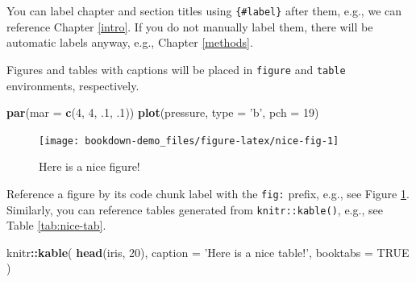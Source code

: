 \documentclass[
]{book}
\newenvironment{Shaded}{\begin{snugshade}}{\end{snugshade}}
\newcommand{\DataTypeTok}[1]{\textcolor[rgb]{0.13,0.29,0.53}{#1}}
\newcommand{\DecValTok}[1]{\textcolor[rgb]{0.00,0.00,0.81}{#1}}
\newcommand{\FloatTok}[1]{\textcolor[rgb]{0.00,0.00,0.81}{#1}}
\newcommand{\KeywordTok}[1]{\textcolor[rgb]{0.13,0.29,0.53}{\textbf{#1}}}
\newcommand{\NormalTok}[1]{#1}
\newcommand{\OperatorTok}[1]{\textcolor[rgb]{0.81,0.36,0.00}{\textbf{#1}}}
\newcommand{\OtherTok}[1]{\textcolor[rgb]{0.56,0.35,0.01}{#1}}
\newcommand{\StringTok}[1]{\textcolor[rgb]{0.31,0.60,0.02}{#1}}
\begin{document}
You can label chapter and section titles using \texttt{\{\#label\}} after them, e.g., we can reference Chapter \ref{intro}. If you do not manually label them, there will be automatic labels anyway, e.g., Chapter \ref{methods}.

Figures and tables with captions will be placed in \texttt{figure} and \texttt{table} environments, respectively.

\begin{Shaded}
\begin{Highlighting}[]
\KeywordTok{par}\NormalTok{(}\DataTypeTok{mar =} \KeywordTok{c}\NormalTok{(}\DecValTok{4}\NormalTok{, }\DecValTok{4}\NormalTok{, }\FloatTok{.1}\NormalTok{, }\FloatTok{.1}\NormalTok{))}
\KeywordTok{plot}\NormalTok{(pressure, }\DataTypeTok{type =} \StringTok{'b'}\NormalTok{, }\DataTypeTok{pch =} \DecValTok{19}\NormalTok{)}
\end{Highlighting}
\end{Shaded}

\begin{figure}

{\centering \texttt{[image: bookdown-demo\_files/figure-latex/nice-fig-1]} 

}

\caption{Here is a nice figure!}\label{fig:nice-fig}
\end{figure}

Reference a figure by its code chunk label with the \texttt{fig:} prefix, e.g., see Figure \ref{fig:nice-fig}. Similarly, you can reference tables generated from \texttt{knitr::kable()}, e.g., see Table \ref{tab:nice-tab}.

\begin{Shaded}
\begin{Highlighting}[]
\NormalTok{knitr}\OperatorTok{::}\KeywordTok{kable}\NormalTok{(}
  \KeywordTok{head}\NormalTok{(iris, }\DecValTok{20}\NormalTok{), }\DataTypeTok{caption =} \StringTok{'Here is a nice table!'}\NormalTok{,}
  \DataTypeTok{booktabs =} \OtherTok{TRUE}
\NormalTok{)}
\end{Highlighting}
\end{Shaded}
\end{document}
